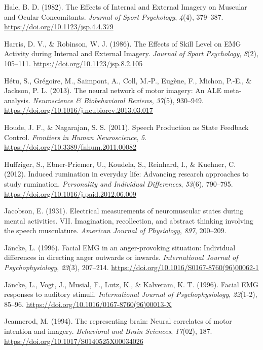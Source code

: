 \documentclass[a4paper,12pt,twoside,openright,oldfontcommands]{memoir}
\begin{document}
\hypertarget{ref-hale_effects_1982}{}
Hale, B. D. (1982). The Effects of Internal and External Imagery on
Muscular and Ocular Concomitants. \emph{Journal of Sport Psychology},
\emph{4}(4), 379--387. \url{https://doi.org/10.1123/jsp.4.4.379}

\hypertarget{ref-harris_effects_1986}{}
Harris, D. V., \& Robinson, W. J. (1986). The Effects of Skill Level on
EMG Activity during Internal and External Imagery. \emph{Journal of
Sport Psychology}, \emph{8}(2), 105--111.
\url{https://doi.org/10.1123/jsp.8.2.105}

\hypertarget{ref-hetu_neural_2013}{}
Hétu, S., Grégoire, M., Saimpont, A., Coll, M.-P., Eugène, F., Michon,
P.-E., \& Jackson, P. L. (2013). The neural network of motor imagery: An
ALE meta-analysis. \emph{Neuroscience \& Biobehavioral Reviews},
\emph{37}(5), 930--949.
\url{https://doi.org/10.1016/j.neubiorev.2013.03.017}

\hypertarget{ref-houde_speech_2011}{}
Houde, J. F., \& Nagarajan, S. S. (2011). Speech Production as State
Feedback Control. \emph{Frontiers in Human Neuroscience}, \emph{5}.
\url{https://doi.org/10.3389/fnhum.2011.00082}

\hypertarget{ref-Huffziger2012}{}
Huffziger, S., Ebner-Priemer, U., Koudela, S., Reinhard, I., \& Kuehner,
C. (2012). Induced rumination in everyday life: Advancing research
approaches to study rumination. \emph{Personality and Individual
Differences}, \emph{53}(6), 790--795.
\url{https://doi.org/10.1016/j.paid.2012.06.009}

\hypertarget{ref-jacobson_electrical_1931}{}
Jacobson, E. (1931). Electrical measurements of neuromuscular states
during mental activities. VII. Imagination, recollection, and abstract
thinking involving the speech musculature. \emph{American Journal of
Physiology}, \emph{897}, 200--209.

\hypertarget{ref-Jancke1996a}{}
Jäncke, L. (1996). Facial EMG in an anger-provoking situation:
Individual differences in directing anger outwards or inwards.
\emph{International Journal of Psychophysiology}, \emph{23}(3),
207--214. \url{https://doi.org/10.1016/S0167-8760(96)00062-1}

\hypertarget{ref-Jancke1996}{}
Jäncke, L., Vogt, J., Musial, F., Lutz, K., \& Kalveram, K. T. (1996).
Facial EMG responses to auditory stimuli. \emph{International Journal of
Psychophysiology}, \emph{22}(1-2), 85--96.
\url{https://doi.org/10.1016/0167-8760(96)00013-X}

\hypertarget{ref-jeannerod_representing_1994}{}
Jeannerod, M. (1994). The representing brain: Neural correlates of motor
intention and imagery. \emph{Behavioral and Brain Sciences},
\emph{17}(02), 187. \url{https://doi.org/10.1017/S0140525X00034026}
\end{document}
